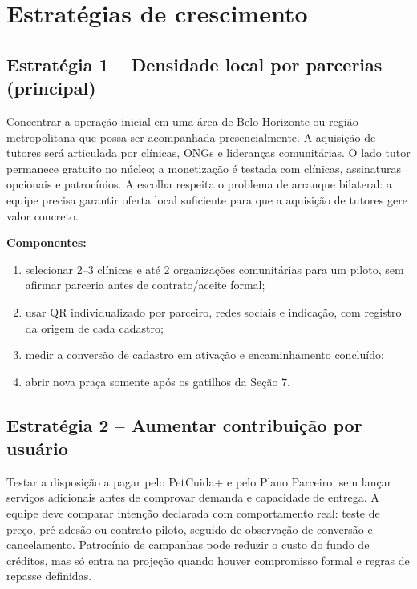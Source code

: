 \section{Estratégias de crescimento}
\subsection{Estratégia 1 -- Densidade local por parcerias (principal)}
Concentrar a operação inicial em uma área de Belo Horizonte ou região metropolitana que possa ser acompanhada presencialmente. A aquisição de tutores será articulada por clínicas, ONGs e lideranças comunitárias. O lado tutor permanece gratuito no núcleo; a monetização é testada com clínicas, assinaturas opcionais e patrocínios. A escolha respeita o problema de arranque bilateral: a equipe precisa garantir oferta local suficiente para que a aquisição de tutores gere valor concreto.

\textbf{Componentes:}
\begin{enumerate}[label=\alph*)]
\item selecionar 2--3 clínicas e até 2 organizações comunitárias para um piloto, sem afirmar parceria antes de contrato/aceite formal;
\item usar QR individualizado por parceiro, redes sociais e indicação, com registro da origem de cada cadastro;
\item medir a conversão de cadastro em ativação e encaminhamento concluído;
\item abrir nova praça somente após os gatilhos da Seção 7.
\end{enumerate}

\subsection{Estratégia 2 -- Aumentar contribuição por usuário}
Testar a disposição a pagar pelo PetCuida+ e pelo Plano Parceiro, sem lançar serviços adicionais antes de comprovar demanda e capacidade de entrega. A equipe deve comparar intenção declarada com comportamento real: teste de preço, pré-adesão ou contrato piloto, seguido de observação de conversão e cancelamento. Patrocínio de campanhas pode reduzir o custo do fundo de créditos, mas só entra na projeção quando houver compromisso formal e regras de repasse definidas.

